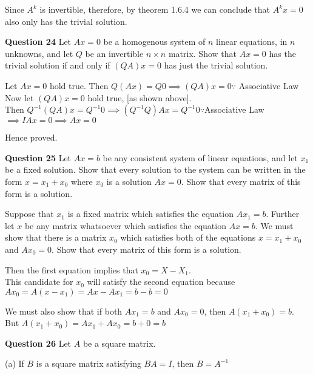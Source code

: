 \documentclass[addpoints]{exam}
\begin{document}
\begin{sloppypar}
\begin{questions}
\begin{solution}
        Since $ A^k $ is invertible, therefore, by theorem 1.6.4 we can conclude that $ A^k x = 0$ also only has the trivial solution.
    \end{solution}  
    \pagebreak
    \question
    \textbf{Question 24}
    Let $ Ax = 0 $ be a homogenous system of $n$ linear equations, in $n$ unknowns, and let $Q$ be an invertible $ n\times n $ matrix. Show that $ Ax = 0 $ has the trivial solution if and only if $ (QA)x = 0 $ has just the trivial solution.
    \begin{solution}
        Let $ Ax = 0 $ hold true. Then $ Q(Ax) = Q0 \implies (QA)x = 0 \because $ Associative Law \\ 
        Now let $ (QA)x = 0 $ hold true, [as shown above]. \\ Then $ Q^{-1} (QA) x = Q^{-1} 0 \implies (Q^{-1}Q)Ax = Q^{-1}0 \because $Associative Law \\ 
        $ \implies IAx = 0 \implies Ax = 0 $

        Hence proved.
    \end{solution}

    \question
    \textbf{Question 25}
    Let $ Ax = b $ be any consistent system of linear equations, and let $x_1$ be a fixed solution. Show that every solution to the system can be written in the form $x = x_1 + x_0$ where $x_0$ is a solution $Ax = 0$. Show that every matrix of this form is a solution. 
    \begin{solution}
        Suppose that $x_1$ is a fixed matrix which satisfies the equation $ Ax_1 = b $. Further let $x$ be any matrix whatsoever which satisfies the equation $Ax = b$. We must show that there is a matrix $x_0$ which satisfies both of the equations $x = x_1 + x_0$ and $Ax_0 = 0$. Show that every matrix of this form is a solution. 

        Then the first equation implies that $ x_0 = X - X_1 $. \\ 
        This candidate for $x_0$ will satisfy the second equation because $ Ax_0 = A(x - x_1) = Ax - Ax_1 = b - b = 0 $

        We must also show that if both $ Ax_1 = b $ and $Ax_0 = 0$, then $ A(x_1 + x_0) = b $. \\ But $ A(x_1 + x_0) = Ax_1 + Ax_0 = b + 0 = b $
    \end{solution}

    \question
    \textbf{Question 26}
    Let $A$ be a square matrix.

    (a) If $B$ is a square matrix satisfying $BA = I$, then $ B = A^{-1} $


\end{questions}
\end{sloppypar}
\end{document}
